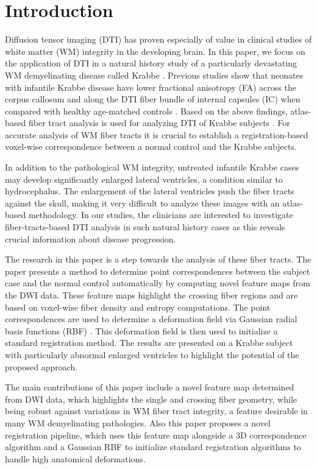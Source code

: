 \documentclass{llncs}
\begin{document}



\section{Introduction}
\label{sec:intro}
Diffusion tensor imaging (DTI) has proven especially of value in clinical studies of white matter (WM) integrity in the developing brain. In this paper, we focus on the application of DTI in a natural history study of a particularly devastating WM demyelinating disease called Krabbe \cite{Escolar09}. Previous studies show that neonates with infantile Krabbe disease have lower fractional anisotropy (FA) across the corpus callosum and along the DTI fiber bundle of internal capsules (IC) when compared with healthy age-matched controls \cite{Guo01}. Based on the above findings, atlas-based fiber tract analysis is used for analyzing DTI of Krabbe subjects \cite{Goodlett06}. For accurate analysis of WM fiber tracts it is crucial to establish a registration-based voxel-wise correspondence between a normal control and the Krabbe subjects. 

In addition to the pathological WM integrity, untreated infantile Krabbe cases may develop significantly enlarged lateral ventricles, a condition similar to hydrocephalus. The enlargement of the lateral ventricles push the fiber tracts against the skull, making it very difficult to analyze these images with an atlas-based methodology. In our studies, the clinicians are interested to investigate fiber-tracts-based DTI analysis in such natural history cases as this reveals crucial information about disease progression.

The research in this paper is a step towards the analysis of these fiber tracts. The paper presents a method to determine point correspondences between the subject case and the normal control automatically by computing novel feature maps from the DWI data. These feature maps highlight the crossing fiber regions and are based on voxel-wise fiber density and entropy computations. The point correspondences are used to determine a deformation field via Gaussian radial basis functions (RBF) \cite{Mike99}. This deformation field  is then used to initialize a standard registration method. The results are presented on a Krabbe subject with particularly abnormal enlarged ventricles to highlight the potential of the proposed approach.

The main contributions of this paper include a novel feature map determined from DWI data, which highlights the single and crossing fiber geometry, while being robust against variations in WM fiber tract integrity, a feature desirable in many WM demyelinating pathologies. Also this paper proposes a novel registration pipeline, which uses this feature map alongside a 3D correspondence algorithm and a Gaussian RBF to initialize standard registration algorithms to handle high anatomical deformations.
\end{document}

